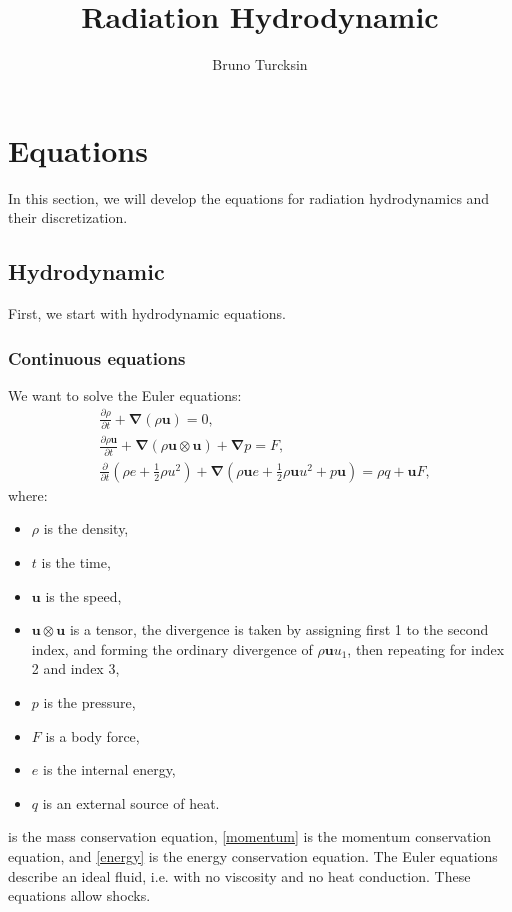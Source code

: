 \documentclass[letterpaper]{report}
\newcommand\bn{\boldsymbol{\nabla}}
\newcommand\bs{\boldsymbol}
\renewcommand{\(}{\left(}
\renewcommand{\)}{\right)}
\renewcommand{\[}{\left[}
\renewcommand{\]}{\right]}
\begin{document}
\title{Radiation Hydrodynamic}
\author{Bruno Turcksin} 
\date{}
\maketitle

\chapter{Equations}
In this section, we will develop the equations for radiation hydrodynamics and
their discretization.
\section{Hydrodynamic}
First, we start with hydrodynamic equations.
\subsection{Continuous equations}
We want to solve the Euler equations:
\begin{align}
  &\frac{\partial \rho}{\partial t} + \bn (\rho \bs{u}) = 0 \label{mass},\\
  &\frac{\partial \rho \bs{u}}{\partial t} + \bn (\rho\bs{u}\otimes\bs{u}) + \bn p =
  F \label{momentum},\\
  &\frac{\partial}{\partial t}\(\rho e +\frac{1}{2}\rho u^2\) +
  \bn\(\rho\bs{u}e + \frac{1}{2}\rho \bs{u} u^2+p\bs{u}\) = \rho q +\bs{u}F
  \label{energy},
\end{align}
where:
\begin{itemize}
  \item $\rho$ is the density,
  \item $t$ is the time,
  \item $\bs{u}$ is the speed,
  \item $\bs{u}\otimes\bs{u}$ is a tensor, the divergence is taken by assigning first
  1 to the second index, and forming the ordinary divergence of
  $\rho\bs{u}u_1$, then repeating for index 2 and index 3,
  \item $p$ is the pressure,
  \item $F$ is a body force,
  \item $e$ is the internal energy,
  \item $q$ is an external source of heat.
\end{itemize}
 is the mass conservation equation, \cref{momentum} is the momentum
conservation equation, and \cref{energy} is the energy conservation equation.
The Euler equations describe an ideal fluid, i.e. with no viscosity and no heat
conduction. These equations allow shocks.
\end{document}
